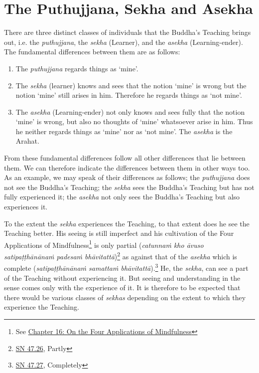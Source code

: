 \chapter{The Puthujjana, Sekha and Asekha}

There are three distinct classes of individuals that the Buddha's Teaching brings out, i.e. the \emph{puthujjana}, the \emph{sekha} (Learner), and the \emph{asekha} (Learning-ender). The fundamental differences between them are as follows:

\begin{enumerate}
\def\labelenumi{\arabic{enumi}.}
\item
  The \emph{puthujjana} regards things as `mine'.
\item
  The \emph{sekha} (learner) knows and sees that the notion `mine' is wrong but the notion `mine' still arises in him. Therefore he regards things as `not mine'.
\item
  The \emph{asekha} (Learning-ender) not only knows and sees fully that the notion `mine' is wrong, but also no thoughts of `mine' whatsoever arise in him. Thus he neither regards things as `mine' nor as `not mine'. The \emph{asekha} is the Arahat.
\end{enumerate}

From these fundamental differences follow all other differences that lie between them. We can therefore indicate the differences between them in other ways too. As an example, we may speak of their differences as follows; the \emph{puthujjana} does not see the Buddha's Teaching; the \emph{sekha} sees the Buddha's Teaching but has not fully experienced it; the \emph{asekha} not only sees the Buddha's Teaching but also  experiences it.

To the extent the \emph{sekha} experiences the Teaching, to that extent does he see the Teaching better. His seeing is still imperfect and his cultivation of the Four Applications of Mindfulness\footnote{See \href{ch-16-satipatthana.xml\#start}{Chapter 16: On the Four Applications of Mindfulness}} is only partial (\emph{catunnaṁ kho āvuso satipaṭṭhānānaṁ padesaṁ bhāvitattā})\footnote{\href{https://suttacentral.net/sn47.26/en/bodhi}{SN 47.26}, Partly} as against that of the \emph{asekha} which is complete (\emph{satipaṭṭhānānaṁ samattaṁ bhāvitattā}).\footnote{\href{https://suttacentral.net/sn47.27/en/bodhi}{SN 47.27}, Completely} He, the \emph{sekha}, can see a part of the Teaching without experiencing it. But seeing and understanding in the  sense comes only with the experience of it. It is therefore to be expected that there would be various classes of \emph{sekhas} depending on the extent to which they experience the Teaching.

